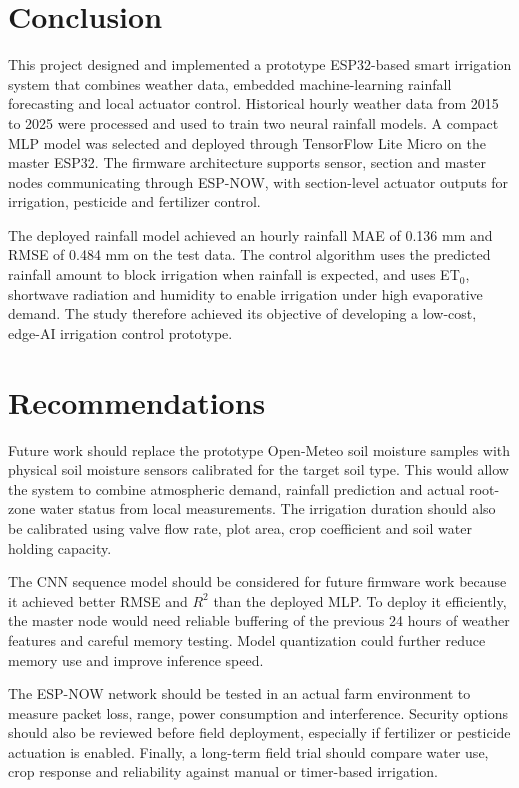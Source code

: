 \documentclass[12pt,a4paper]{report}
\begin{document}
\section{Conclusion}
This project designed and implemented a prototype ESP32-based smart irrigation system that combines weather data, embedded machine-learning rainfall forecasting and local actuator control. Historical hourly weather data from 2015 to 2025 were processed and used to train two neural rainfall models. A compact MLP model was selected and deployed through TensorFlow Lite Micro on the master ESP32. The firmware architecture supports sensor, section and master nodes communicating through ESP-NOW, with section-level actuator outputs for irrigation, pesticide and fertilizer control.

The deployed rainfall model achieved an hourly rainfall MAE of 0.136 mm and RMSE of 0.484 mm on the test data. The control algorithm uses the predicted rainfall amount to block irrigation when rainfall is expected, and uses ET$_0$, shortwave radiation and humidity to enable irrigation under high evaporative demand. The study therefore achieved its objective of developing a low-cost, edge-AI irrigation control prototype.

\section{Recommendations}
Future work should replace the prototype Open-Meteo soil moisture samples with physical soil moisture sensors calibrated for the target soil type. This would allow the system to combine atmospheric demand, rainfall prediction and actual root-zone water status from local measurements. The irrigation duration should also be calibrated using valve flow rate, plot area, crop coefficient and soil water holding capacity.

The CNN sequence model should be considered for future firmware work because it achieved better RMSE and $R^2$ than the deployed MLP. To deploy it efficiently, the master node would need reliable buffering of the previous 24 hours of weather features and careful memory testing. Model quantization could further reduce memory use and improve inference speed.

The ESP-NOW network should be tested in an actual farm environment to measure packet loss, range, power consumption and interference. Security options should also be reviewed before field deployment, especially if fertilizer or pesticide actuation is enabled. Finally, a long-term field trial should compare water use, crop response and reliability against manual or timer-based irrigation.

\singlespacing
\renewcommand{\bibname}{REFERENCES}

\end{document}
